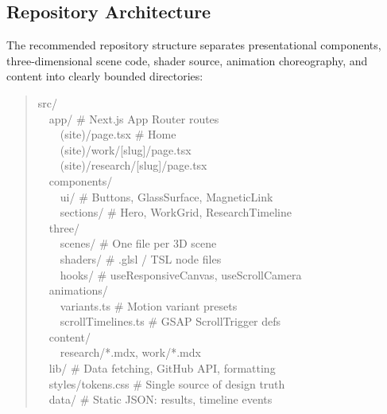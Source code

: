 \documentclass[conference]{IEEEtran}
\begin{document}
\subsection{Repository Architecture}
The recommended repository structure separates presentational components, three-dimensional scene code, shader source, animation choreography, and content into clearly bounded directories:

\begin{quote}
\ttfamily\footnotesize
src/\\
\ \ app/ \quad\# Next.js App Router routes\\
\ \ \ \ (site)/page.tsx \quad\# Home\\
\ \ \ \ (site)/work/[slug]/page.tsx\\
\ \ \ \ (site)/research/[slug]/page.tsx\\
\ \ components/\\
\ \ \ \ ui/ \quad\# Buttons, GlassSurface, MagneticLink\\
\ \ \ \ sections/ \quad\# Hero, WorkGrid, ResearchTimeline\\
\ \ three/\\
\ \ \ \ scenes/ \quad\# One file per 3D scene\\
\ \ \ \ shaders/ \quad\# .glsl / TSL node files\\
\ \ \ \ hooks/ \quad\# useResponsiveCanvas, useScrollCamera\\
\ \ animations/\\
\ \ \ \ variants.ts \quad\# Motion variant presets\\
\ \ \ \ scrollTimelines.ts \quad\# GSAP ScrollTrigger defs\\
\ \ content/\\
\ \ \ \ research/*.mdx, work/*.mdx\\
\ \ lib/ \quad\# Data fetching, GitHub API, formatting\\
\ \ styles/tokens.css \quad\# Single source of design truth\\
\ \ data/ \quad\# Static JSON: results, timeline events
\end{quote}
\end{document}
